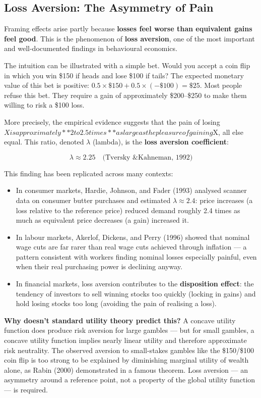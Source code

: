 \documentclass[12pt, letterpaper]{article}
\begin{document}
\medskip


\subsection{Loss Aversion: The Asymmetry of Pain}


Framing effects arise partly because \textbf{losses feel worse than equivalent gains feel good}. This is the phenomenon of \textbf{loss aversion}, one of the most important and well-documented findings in behavioural economics.


The intuition can be illustrated with a simple bet. Would you accept a coin flip in which you win \$150 if heads and lose \$100 if tails? The expected monetary value of this bet is positive: $0.5 \times \$150 + 0.5 \times (-\$100) = \$25$. Most people refuse this bet. They require a gain of approximately \$200--\$250 to make them willing to risk a \$100 loss.

More precisely, the empirical evidence suggests that the pain of losing $X is approximately **2 to 2.5 times** as large as the pleasure of gaining $X, all else equal. This ratio, denoted $\lambda$ (lambda), is the \textbf{loss aversion coefficient}:

$$\lambda \approx 2.25 \quad \text{(Tversky \& Kahneman, 1992)}$$

This finding has been replicated across many contexts:

\begin{itemize}
\item In consumer markets, Hardie, Johnson, and Fader (1993) analysed scanner data on consumer butter purchases and estimated $\lambda \approx 2.4$: price increases (a loss relative to the reference price) reduced demand roughly 2.4 times as much as equivalent price decreases (a gain) increased it.
\item In labour markets, Akerlof, Dickens, and Perry (1996) showed that nominal wage cuts are far rarer than real wage cuts achieved through inflation --- a pattern consistent with workers finding nominal losses especially painful, even when their real purchasing power is declining anyway.
\item In financial markets, loss aversion contributes to the \textbf{disposition effect}: the tendency of investors to sell winning stocks too quickly (locking in gains) and hold losing stocks too long (avoiding the pain of realising a loss).
\end{itemize}

\textbf{Why doesn't standard utility theory predict this?} A concave utility function does produce risk aversion for large gambles --- but for small gambles, a concave utility function implies nearly linear utility and therefore approximate risk neutrality. The observed aversion to small-stakes gambles like the \$150/\$100 coin flip is too strong to be explained by diminishing marginal utility of wealth alone, as Rabin (2000) demonstrated in a famous theorem. Loss aversion --- an asymmetry around a reference point, not a property of the global utility function --- is required.
\end{document}
